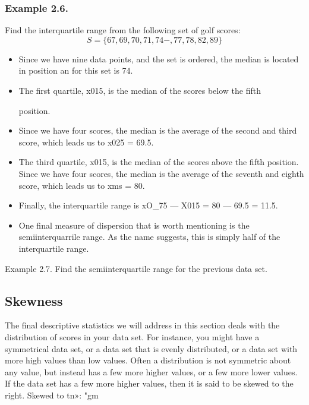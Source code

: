 \subsubsection*{Example 2.6.}
Find the interquartile range from the following set of
golf scores:
\[S = \{67, 69, 70, 71, 74-, 77, 78, 82, 89\} \]
\begin{itemize}

\item Since we have nine data points, and the set is ordered, the median is
located in position %
an for this set is 74.

\item The ﬁrst quartile, x015, is the median of the scores below the ﬁfth



position. 
\item Since we have four scores, the median is the average of the
second and third score, which leads us to x025 = 69.5.
\item The third quartile, x015, is the median of the scores above the ﬁfth
position. Since we have four scores, the median is the average of the
seventh and eighth score, which leads us to xms = 80.
\item Finally, the interquartile range is xO_75 — X015 = 80 — 69.5 = 11.5.
\item One ﬁnal measure of dispersion that is worth mentioning is the
semiinterquarrile range. As the name suggests, this is simply half of the
interquartile range.
\end{itemize}

Example 2.7. Find the semiinterquartile range for the previous data
set.
\newpage
\subsection*{Skewness}
The ﬁnal descriptive statistics we will address in this section deals with
the distribution of scores in your data set. For instance, you might have
a symmetrical data set, or a data set that is evenly distributed, or a data
set with more high values than low values.
Often a distribution is not symmetric about any value, but
instead has a few more higher values, or a few more lower values. If the
data set has a few more higher values, then it is said to be skewed to the
right.
Skewed to
tn»: "gm

